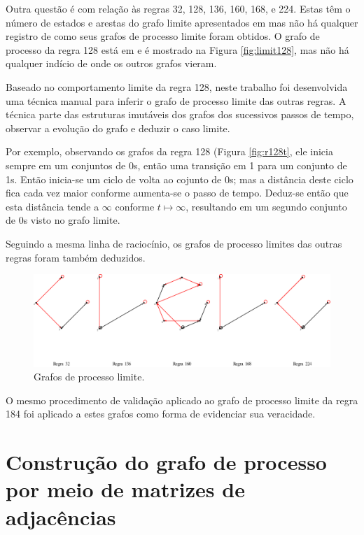 \documentclass[12pt,a4paper]{article}
\begin{document}
Outra questão é com relação às regras 32, 128, 136, 160, 168, e 224. Estas têm
o número de estados e arestas do grafo limite apresentados em
 mas não há qualquer registro de como seus grafos
de processo limite foram obtidos. O grafo de processo da regra 128 está
em  e é mostrado na Figura \ref{fig:limit128}, mas
não há qualquer indício de onde os outros grafos vieram.

Baseado no comportamento limite da regra 128, neste trabalho foi desenvolvida
uma técnica manual para inferir o grafo de processo limite das outras regras.
A técnica parte das estruturas imutáveis dos grafos dos
sucessivos passos de tempo, observar a evolução do grafo e deduzir o caso
limite.

Por exemplo, observando os grafos da regra 128 (Figura \ref{fig:r128t}, ele
inicia sempre em um conjuntos de 0s, então uma transição em 1 para um
conjunto de 1s.  Então inicia-se um ciclo de volta ao cojunto de 0s; mas a
distância deste ciclo fica cada vez maior conforme aumenta-se o passo de
tempo. Deduz-se então que esta distância tende a $\infty$ conforme
$t \mapsto \infty$, resultando em um segundo conjunto de 0s visto no grafo
limite.

Seguindo a mesma linha de raciocínio, os grafos de processo limites das
outras regras foram também deduzidos.

\begin{figure}[H]
\begin{center}
\includegraphics[scale=0.5]{img/Limits.eps}
\caption{Grafos de processo limite.}
\label{fig:limits}
\end{center}
\end{figure}

O mesmo procedimento de validação aplicado ao grafo de processo limite da
regra 184 foi aplicado a estes grafos como forma de evidenciar sua
veracidade.

\newpage

\section{Construção do grafo de processo por meio de matrizes de
adjacências}\label{sec:matrix}
\end{document}

